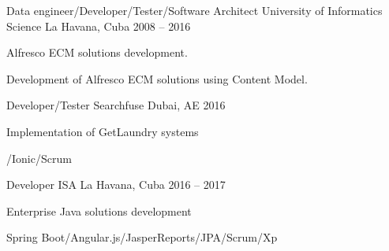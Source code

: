 


\begin{cventries}


\cventry
{Data engineer/Developer/Tester/Software Architect } %
{University of Informatics Science} %
{La Havana, Cuba} %
{2008 – 2016} %
{ %
\begin{cvitems}
\item {Alfresco ECM solutions development.}
\item {Development of Alfresco ECM solutions using Content Model.}
\end{cvitems}
}


\cventry
{Developer/Tester} %
{Searchfuse} %
{Dubai, AE} %
{2016} %
{ %
\begin{cvitems}
\item {Implementation of GetLaundry systems}
\item {/Ionic/Scrum}
\end{cvitems}
}


\cventry
{Developer} %
{ISA} %
{La Havana, Cuba} %
{2016 – 2017} %
{ %
\begin{cvitems}
\item {Enterprise Java solutions development}
\item {Spring Boot/Angular.js/JasperReports/JPA/Scrum/Xp}
\end{cvitems}
}


\end{cventries}

